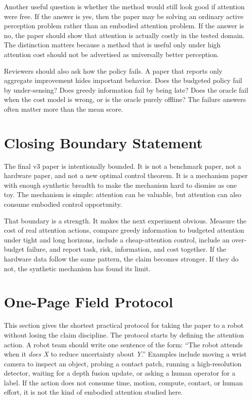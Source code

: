 \documentclass{article}
\begin{document}
Another useful question is whether the method would still look good if
attention were free. If the answer is yes, then the paper may be solving an
ordinary active perception problem rather than an embodied attention problem.
If the answer is no, the paper should show that attention is actually costly
in the tested domain. The distinction matters because a method that is useful
only under high attention cost should not be advertised as universally better
perception.

Reviewers should also ask how the policy fails. A paper that reports only
aggregate improvement hides important behavior. Does the budgeted policy fail
by under-sensing? Does greedy information fail by being late? Does the oracle
fail when the cost model is wrong, or is the oracle purely offline? The failure
answers often matter more than the mean score.

\section{Closing Boundary Statement}

The final v3 paper is intentionally bounded. It is not a benchmark paper, not a
hardware paper, and not a new optimal control theorem. It is a mechanism paper
with enough synthetic breadth to make the mechanism hard to dismiss as one
toy. The mechanism is simple: attention can be valuable, but attention can
also consume embodied control opportunity.

That boundary is a strength. It makes the next experiment obvious. Measure the
cost of real attention actions, compare greedy information to budgeted
attention under tight and long horizons, include a cheap-attention control,
include an over-budget failure, and report task, risk, information, and cost
together. If the hardware data follow the same pattern, the claim becomes
stronger. If they do not, the synthetic mechanism has found its limit.

\section{One-Page Field Protocol}

This section gives the shortest practical protocol for taking the paper to a
robot without losing the claim discipline. The protocol starts by defining the
attention action. A robot team should write one sentence of the form:
``The robot attends when it \emph{does X} to reduce uncertainty about
\emph{Y}.'' Examples include moving a wrist camera to inspect an object,
probing a contact patch, running a high-resolution detector, waiting for a
depth fusion update, or asking a human operator for a label. If the action
does not consume time, motion, compute, contact, or human effort, it is not the
kind of embodied attention studied here.
\end{document}

